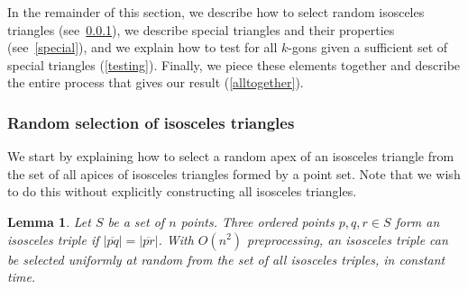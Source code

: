 \documentclass{article}
\newtheorem{lemma}{Lemma}
\begin{document}
\noindent In the remainder of this section, we describe how to select random isosceles triangles 
(see~\ref{random}),  we describe special triangles and their properties (see~\ref{special}), and
we explain how to test for all $k$-gons given a sufficient set of special triangles (\ref{testing}).
Finally, we piece these elements together and describe the entire process that gives our result
(\ref{alltogether}).




\subsubsection{Random selection of isosceles triangles}
\label{random}
We start by explaining how to select a random apex of an isosceles triangle from the set of all apices of isosceles
triangles formed by a point set.   Note that we wish to do this without explicitly constructing
all isosceles triangles.
\begin{lemma}
\label{lem:random}
Let $S$ be a set of $n$ points. Three ordered points $p,q,r \in S$ form an \emph{isosceles
triple} if $|\overline{pq}| = |\overline{pr}|$.
With $O(n^2)$ preprocessing, an isosceles triple can be selected
uniformly at random from the set of all isosceles triples, in constant time.
\end{lemma}
\end{document}
